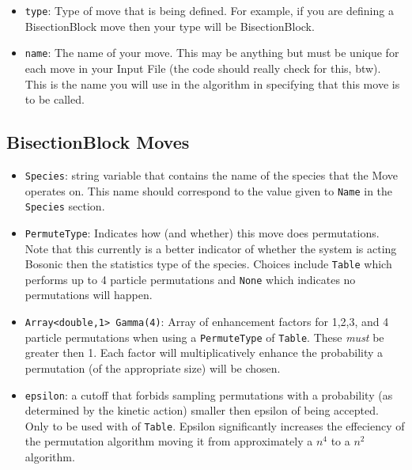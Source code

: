 \documentclass{book}
\begin{document}
\begin{itemize}
   \item \texttt{type}:  Type of move that is being
   defined.  For example, if you are defining a BisectionBlock move
   then your type will be BisectionBlock.

   \item \texttt{name}:  The name of your move. This may be anything
   but must be unique for each move in your Input File (the code should
   really check for this, btw).  This is the name you will use in the
   algorithm in specifying that this move is to be called.
\end{itemize}

\subsection{BisectionBlock Moves}
 
\begin{itemize}

   \item \texttt{Species}: string variable that contains the name of
   the species that the Move operates on.  This name should correspond
   to the value given to \texttt{Name} in the \texttt{Species}
   section.


   \item \texttt{PermuteType}: Indicates how (and whether) this move
   does permutations.  Note that this currently is a better indicator
   of whether the system is acting Bosonic then the statistics type of
   the species.  Choices include \texttt{Table} which performs up to 4
   particle permutations and \texttt{None} which indicates no
   permutations will happen.

   \item \texttt{Array<double,1> Gamma(4)}: Array of enhancement
     factors for 1,2,3, and 4 particle
     permutations when using a \texttt{PermuteType} of \texttt{Table}.
     These {\em must} be greater then 1.  Each factor will
     multiplicatively enhance the
     probability a permutation (of the appropriate size) will be chosen.
     
   \item \texttt{epsilon}: a cutoff that forbids sampling permutations with
     a probability (as determined by the kinetic action) smaller then epsilon 
     of being accepted.  Only to be used with  of
     \texttt{Table}. Epsilon significantly increases the 
     effeciency of the permutation algorithm moving it from
     approximately a $n^4$ to a $n^2$ algorithm. 

\end{itemize}
\end{document}
